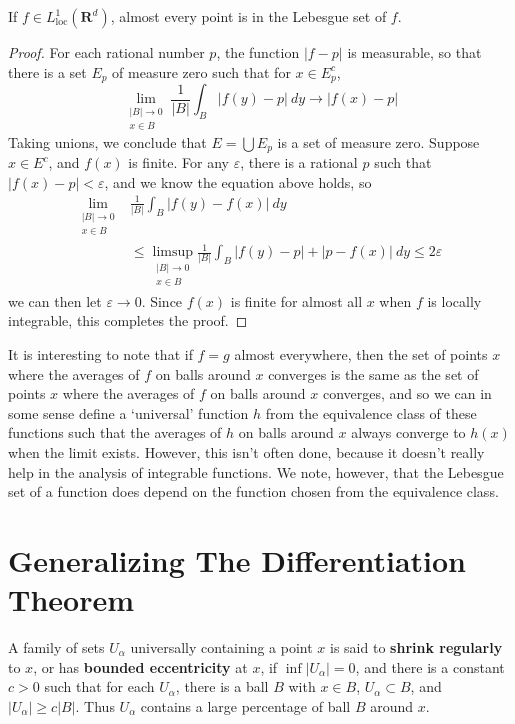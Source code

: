 \begin{theorem}
    If $f \in L^1_{\text{loc}}(\mathbf{R}^d)$, almost every point is in the Lebesgue set of $f$.
\end{theorem}
\begin{proof}
    For each rational number $p$, the function $|f - p|$ is measurable, so that there is a set $E_p$ of measure zero such that for $x \in E_p^c$,
    \[ \lim_{\substack{|B| \to 0\\x \in B}} \frac{1}{|B|} \int_B |f(y) - p|\ dy \to |f(x) - p| \]
    Taking unions, we conclude that $E = \bigcup E_p$ is a set of measure zero. Suppose $x \in E^c$, and $f(x)$ is finite. For any $\varepsilon$, there is a rational $p$ such that $|f(x) - p| < \varepsilon$, and we know the equation above holds, so
    \begin{align*}
        \lim_{\substack{|B| \to 0\\x \in B}} &\frac{1}{|B|} \int_B |f(y) - f(x)|\ dy\\
        &\leq \limsup_{\substack{|B| \to 0\\x \in B}} \frac{1}{|B|} \int_B |f(y) - p| + |p - f(x)|\ dy \leq 2\varepsilon
    \end{align*}
    we can then let $\varepsilon \to 0$. Since $f(x)$ is finite for almost all $x$ when $f$ is locally integrable, this completes the proof.
\end{proof}

It is interesting to note that if $f = g$ almost everywhere, then the set of points $x$ where the averages of $f$ on balls around $x$ converges is the same as the set of points $x$ where the averages of $f$ on balls around $x$ converges, and so we can in some sense define a `universal' function $h$ from the equivalence class of these functions such that the averages of $h$ on balls around $x$ always converge to $h(x)$ when the limit exists. However, this isn't often done, because it doesn't really help in the analysis of integrable functions. We note, however, that the Lebesgue set of a function does depend on the function chosen from the equivalence class.

\section{Generalizing The Differentiation Theorem}

A family of sets $U_\alpha$ universally containing a point $x$ is said to {\bf shrink regularly} to $x$, or has {\bf bounded eccentricity} at $x$, if $\inf |U_\alpha| = 0$, and there is a constant $c > 0$ such that for each $U_\alpha$, there is a ball $B$ with $x \in B$, $U_\alpha \subset B$, and $|U_\alpha| \geq c |B|$. Thus $U_\alpha$ contains a large percentage of ball $B$ around $x$.

